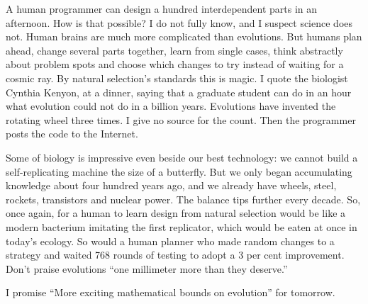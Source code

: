 A human programmer can design a hundred interdependent parts in an afternoon. How is that possible? I do not fully know, and I suspect science does not. Human brains are much more complicated than evolutions. But humans plan ahead, change several parts together, learn from single cases, think abstractly about problem spots and choose which changes to try instead of waiting for a cosmic ray. By natural selection's standards this is magic. I quote the biologist Cynthia Kenyon, at a dinner, saying that a graduate student can do in an hour what evolution could not do in a billion years. Evolutions have invented the rotating wheel three times. I give no source for the count. Then the programmer posts the code to the Internet.

Some of biology is impressive even beside our best technology: we cannot build a self-replicating machine the size of a butterfly. But we only began accumulating knowledge about four hundred years ago, and we already have wheels, steel, rockets, transistors and nuclear power. The balance tips further every decade. So, once again, for a human to learn design from natural selection would be like a modern bacterium imitating the first replicator, which would be eaten at once in today's ecology. So would a human planner who made random changes to a strategy and waited 768 rounds of testing to adopt a 3 per cent improvement. Don't praise evolutions ``one millimeter more than they deserve.''

I promise ``More exciting mathematical bounds on evolution'' for tomorrow. 
